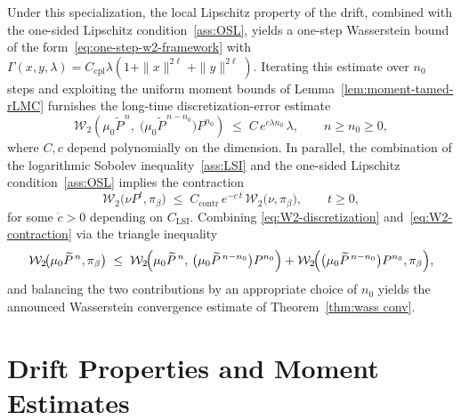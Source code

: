 \documentclass[11pt,a4paper,reqno]{amsart}
\theoremstyle{plain}
\theoremstyle{definition}
\theoremstyle{remark}
\newcommand{\W}{\mathcal{W}_2}
\begin{document}
Under this specialization, the local Lipschitz property of
the drift, combined with the one-sided Lipschitz
condition~\ref{ass:OSL}, yields a one-step Wasserstein bound of the
form~\eqref{eq:one-step-w2-framework} with
$\Gamma(x,y,\lambda)=C_{\mathrm{cpl}}\lambda(1+\|x\|^{2\ell}+\|y\|^{2\ell})$.
Iterating this estimate over $n_0$ steps and exploiting the uniform
moment bounds of
Lemma~\ref{lem:moment-tamed-rLMC} furnishes the long-time
discretization-error estimate
\begin{equation}\label{eq:W2-discretization}
  \W\!\left(\mu_0\widetilde P^{\,n},\;\bigl(\mu_0\widetilde P^{\,n-n_0}\bigr)P^{n_0}\right)
  \;\le\;
  C\,e^{c\lambda n_0}\,\lambda,
  \qquad
  n\ge n_0\ge0,
\end{equation}
where $C,c$ depend polynomially on the dimension. In parallel, the
combination of the logarithmic Sobolev inequality~\ref{ass:LSI} and the one-sided
Lipschitz condition~\ref{ass:OSL} implies the contraction
\begin{equation}\label{eq:W2-contraction}
  \W\!\bigl(\nu P^{t},\pi_\beta\bigr)
  \;\le\;
  C_{\mathrm{contr}}\,e^{-\dot c\,t}\,\W\!\bigl(\nu,\pi_\beta\bigr),
  \qquad
  t\ge0,
\end{equation}
for some $\dot c>0$ depending on $C_{\mathrm{LSI}}$. Combining
\eqref{eq:W2-discretization} and~\eqref{eq:W2-contraction} via the
triangle inequality
\[
  \W\!\bigl(\mu_0\widetilde P^{\,n},\pi_\beta\bigr)
  \;\le\;
  \W\!\Bigl(\mu_0\widetilde P^{\,n},\,
            \bigl(\mu_0\widetilde P^{\,n-n_0}\bigr)P^{n_0}\Bigr)
  +\W\!\Bigl(\bigl(\mu_0\widetilde P^{\,n-n_0}\bigr)P^{n_0},\pi_\beta\Bigr),
\]
and balancing the two contributions by an appropriate choice of $n_0$
yields the announced Wasserstein convergence estimate of
Theorem~\ref{thm:wass conv}.



%





\appendix
{}


\newcommand{\hl}{h_\lambda}

\section{Drift Properties and Moment Estimates}
\label{app:drift-moments}
\end{document}
